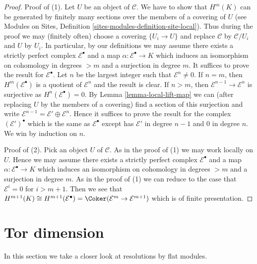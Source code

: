 \begin{proof}
Proof of (1). Let $U$ be an object of $\mathcal{C}$. We have to show that
$H^m(K)$ can be generated by finitely many sections over the members of
a covering of $U$ (see
Modules on Sites, Definition \ref{sites-modules-definition-site-local}).
Thus during the proof we may (finitely often) choose a covering
$\{U_i \to U\}$ and replace $\mathcal{C}$ by $\mathcal{C}/U_i$ and
$U$ by $U_i$. In particular, by our definitions we may assume there exists
a strictly perfect complex $\mathcal{E}^\bullet$ and a map
$\alpha : \mathcal{E}^\bullet \to K$ which induces
an isomorphism on cohomology in degrees $> m$ and a surjection in degree $m$.
It suffices to prove the result for $\mathcal{E}^\bullet$.
Let $n$ be the largest integer such that $\mathcal{E}^n \not = 0$.
If $n = m$, then $H^m(\mathcal{E}^\bullet)$ is a quotient of
$\mathcal{E}^n$ and the result is clear.
If $n > m$, then $\mathcal{E}^{n - 1} \to \mathcal{E}^n$ is surjective as
$H^n(\mathcal{E}^\bullet) = 0$. By Lemma \ref{lemma-local-lift-map}
we can (after replacing $U$ by the members of a covering)
find a section of this surjection and write
$\mathcal{E}^{n - 1} = \mathcal{E}' \oplus \mathcal{E}^n$.
Hence it suffices to prove the result for the complex
$(\mathcal{E}')^\bullet$ which is the same as $\mathcal{E}^\bullet$
except has $\mathcal{E}'$ in degree $n - 1$ and $0$ in degree $n$.
We win by induction on $n$.

\medskip\noindent
Proof of (2). Pick an object $U$ of $\mathcal{C}$.
As in the proof of (1) we may work locally on $U$.
Hence we may assume there exists a strictly perfect complex
$\mathcal{E}^\bullet$ and a map
$\alpha : \mathcal{E}^\bullet \to K$ which induces
an isomorphism on cohomology in degrees $> m$ and a surjection in degree $m$.
As in the proof of (1) we can reduce to the case that $\mathcal{E}^i = 0$
for $i > m + 1$. Then we see that
$H^{m + 1}(K) \cong H^{m + 1}(\mathcal{E}^\bullet) =
\Coker(\mathcal{E}^m \to \mathcal{E}^{m + 1})$
which is of finite presentation.
\end{proof}








\section{Tor dimension}
\label{section-tor}

\noindent
In this section we take a closer look at resolutions by flat modules.

